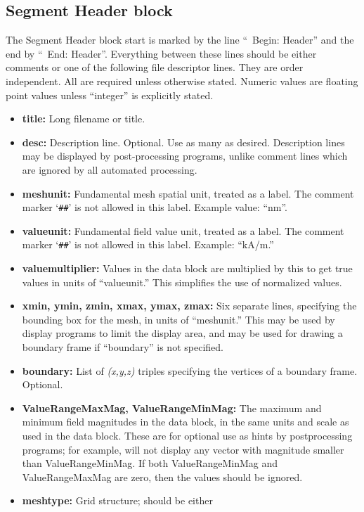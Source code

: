 \subsection{Segment Header block}\label{sec:ovfsegmentheader}
The Segment Header block start is marked by the line
``\lb~Begin: Header'' and the end by ``\lb~End: Header''.  Everything
between these lines should be either comments or one of the following
file descriptor lines.  They are order independent.  All are required
unless otherwise stated.  Numeric values are floating point values
unless ``integer'' is explicitly stated.
\begin{itemize}
\item {\bf title:} Long filename or title.
\item {\bf desc:} Description line.  Optional.  Use as many as desired.
   Description lines may be displayed by post-processing programs,
   unlike comment lines which are ignored by all automated processing.
\item {\bf meshunit:} Fundamental mesh spatial unit, treated as a
   label.  The comment marker `\verb+##+' is not allowed in this label.
   Example value: ``nm''.
\item {\bf valueunit:} Fundamental field value unit, treated as a
   label.  The comment marker `\verb+##+' is not allowed in this label.
   Example: ``kA/m.''
\item {\bf valuemultiplier:} Values in the data block are multiplied by
   this to get true values in units of ``valueunit.''  This simplifies
   the use of normalized values.
\item {\bf xmin, ymin, zmin, xmax, ymax, zmax:} Six separate lines,
   specifying the bounding box for the mesh, in units of ``meshunit.''
   This may be used by display programs to limit the display area,
   and may be used for drawing a boundary frame if ``boundary'' is not
   specified.
\item {\bf boundary:} List of {\it (x,y,z)} triples specifying the
   vertices of a boundary frame.  Optional.
\item {\bf ValueRangeMaxMag, ValueRangeMinMag:}  The maximum and
   minimum field magnitudes in the data block, in the same
   units and scale as used in the data block.  These are for optional
   use as hints by postprocessing programs; for example, 
   will not display any vector with magnitude smaller than
   ValueRangeMinMag.  If both ValueRangeMinMag and ValueRangeMaxMag
   are zero, then the values should be ignored.
\item {\bf meshtype:} Grid structure; should be either

\end{itemize}
